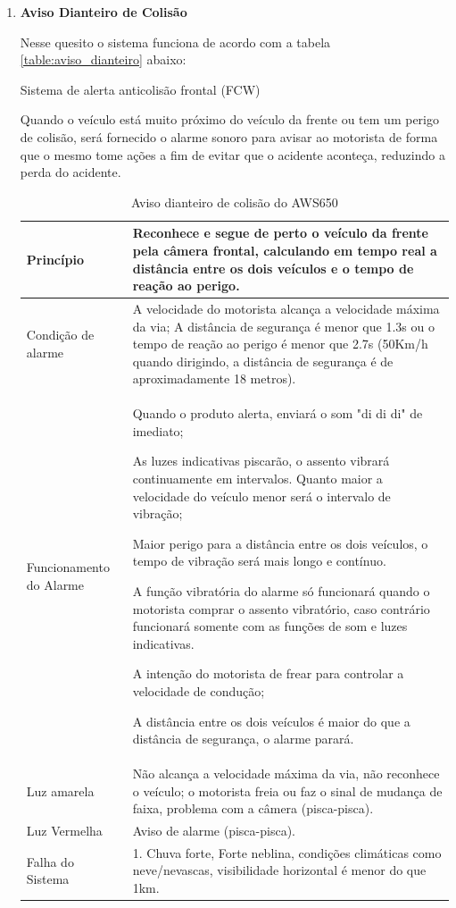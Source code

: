 \begin{enumerate}
\item \textbf{Aviso Dianteiro de Colisão}

Nesse quesito o sistema funciona de acordo com a tabela \ref{table:aviso_dianteiro} abaixo:

Sistema de alerta anticolisão frontal (FCW)

Quando o veículo está muito próximo do veículo da frente ou tem um perigo de colisão, será fornecido o alarme sonoro para avisar ao motorista de forma que o mesmo tome ações a fim de evitar que o acidente aconteça, reduzindo a perda do acidente.

\begin{table}[ht]
\caption{Aviso dianteiro de colisão do AWS650}
\centering
\begin{tabular}{| l |  p{10cm} |}
\hline
Princípio & Reconhece e segue de perto o veículo da frente pela câmera frontal, calculando em tempo real a distância entre os dois veículos e o tempo de reação ao perigo. \\
\hline
Condição de alarme & A velocidade do motorista alcança a velocidade máxima da via;
A distância de segurança é menor que 1.3s ou o tempo de reação ao perigo é menor que 2.7s (50Km/h quando dirigindo, a distância de segurança é de aproximadamente 18 metros).
\\
\hline
Funcionamento do Alarme & Quando o produto alerta, enviará o som "di di di" de imediato;

As luzes indicativas piscarão, o assento vibrará continuamente em intervalos. Quanto maior a velocidade do veículo menor será o intervalo de vibração;

Maior perigo para a distância entre os dois veículos, o tempo de vibração será mais longo e contínuo.

A função vibratória do alarme só funcionará quando o motorista comprar o assento vibratório, caso contrário funcionará somente com as funções de som e luzes indicativas.

A intenção do motorista de frear para controlar a velocidade de condução;

A distância entre os dois veículos é maior do que a distância de segurança, o alarme parará.
 \\
\hline
Luz amarela & Não alcança a velocidade máxima da via, não reconhece o veículo; o motorista freia ou faz o sinal de mudança de faixa, problema com a câmera (pisca-pisca).
 \\
\hline
Luz Vermelha & Aviso de alarme (pisca-pisca). \\
\hline
Falha do Sistema & 1. Chuva forte, Forte neblina, condições climáticas como neve/nevascas, visibilidade horizontal é menor do que 1km.


\end{tabular}
\end{table}
\end{enumerate}
